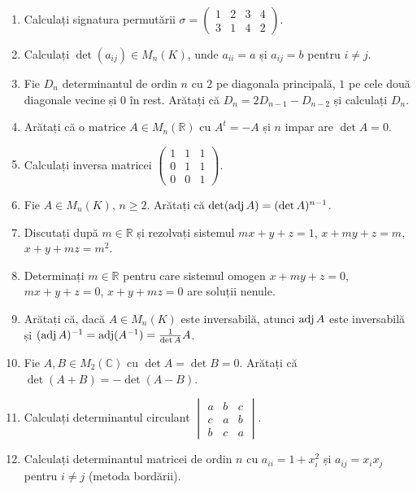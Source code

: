 \begin{enumerate}[label=\textbf{\arabic*.},leftmargin=*]
\item Calculați signatura permutării $\sigma=\begin{pmatrix}1&2&3&4\\3&1&4&2\end{pmatrix}$.
\item Calculați $\det(a_{ij})\in M_n(K)$, unde $a_{ii}=a$ și $a_{ij}=b$ pentru $i\neq j$.
\item Fie $D_n$ determinantul de ordin $n$ cu $2$ pe diagonala principală, $1$ pe cele două diagonale vecine și $0$ în rest. Arătați că $D_n=2D_{n-1}-D_{n-2}$ și calculați $D_n$.
\item Arătați că o matrice $A\in M_n(\mathbb{R})$ cu $A^t=-A$ și $n$ impar are $\det A=0$.
\item Calculați inversa matricei $\begin{pmatrix}1&1&1\\0&1&1\\0&0&1\end{pmatrix}$.
\item Fie $A\in M_n(K)$, $n\ge2$. Arătați că $\det(\operatorname{adj} A)=(\det A)^{n-1}$.
\item Discutați după $m\in\mathbb{R}$ și rezolvați sistemul $mx+y+z=1$, $x+my+z=m$, $x+y+mz=m^2$.
\item Determinați $m\in\mathbb{R}$ pentru care sistemul omogen $x+my+z=0$, $mx+y+z=0$, $x+y+mz=0$ are soluții nenule.
\item Arătați că, dacă $A\in M_n(K)$ este inversabilă, atunci $\operatorname{adj} A$ este inversabilă și $(\operatorname{adj} A)^{-1}=\operatorname{adj}(A^{-1})=\frac{1}{\det A}A$.
\item Fie $A,B\in M_2(\mathbb{C})$ cu $\det A=\det B=0$. Arătați că $\det(A+B)=-\det(A-B)$.
\item Calculați determinantul circulant $\begin{vmatrix}a&b&c\\c&a&b\\b&c&a\end{vmatrix}$.
\item Calculați determinantul matricei de ordin $n$ cu $a_{ii}=1+x_i^2$ și $a_{ij}=x_ix_j$ pentru $i\neq j$ (metoda bordării).
\end{enumerate}

